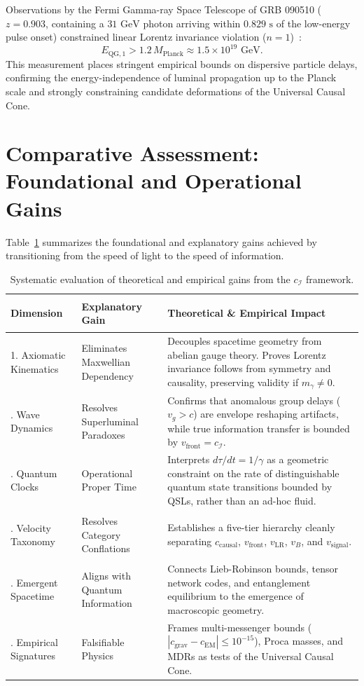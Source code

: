 \documentclass[11pt,a4paper]{article}
\begin{document}
Observations by the Fermi Gamma-ray Space Telescope of GRB 090510 ($z = 0.903$, containing a $31\text{ GeV}$ photon arriving within $0.829\text{ s}$ of the low-energy pulse onset) constrained linear Lorentz invariance violation ($n = 1$)~\cite{fermi2009}:
\begin{equation}
E_{\text{QG}, 1} > 1.2\, M_{\text{Planck}} \approx 1.5 \times 10^{19}\text{ GeV}.
\end{equation}
This measurement places stringent empirical bounds on dispersive particle delays, confirming the energy-independence of luminal propagation up to the Planck scale and strongly constraining candidate deformations of the Universal Causal Cone.

\section{Comparative Assessment: Foundational and Operational Gains}

Table~\ref{tab:evaluation} summarizes the foundational and explanatory gains achieved by transitioning from the speed of light to the speed of information.

\begin{table}[htbp]
\centering
\small
\begin{tabularx}{\linewidth}{>{\bfseries\raggedright}p{3.5cm} >{\raggedright}p{3.0cm} X}
\toprule
Dimension & Explanatory Gain & Theoretical \& Empirical Impact \\
\midrule
1. Axiomatic Kinematics & Eliminates Maxwellian Dependency & Decouples spacetime geometry from abelian gauge theory. Proves Lorentz invariance follows from symmetry and causality, preserving validity if $m_\gamma \neq 0$. \\
\addlinespace
2. Wave Dynamics & Resolves Superluminal Paradoxes & Confirms that anomalous group delays ($v_g > c$) are envelope reshaping artifacts, while true information transfer is bounded by $v_{\text{front}} = c_{\mathcal{I}}$. \\
\addlinespace
3. Quantum Clocks & Operational Proper Time & Interprets $d\tau/dt = 1/\gamma$ as a geometric constraint on the rate of distinguishable quantum state transitions bounded by QSLs, rather than an ad-hoc fluid. \\
\addlinespace
4. Velocity Taxonomy & Resolves Category Conflations & Establishes a five-tier hierarchy cleanly separating $c_{\text{causal}}$, $v_{\text{front}}$, $v_{\text{LR}}$, $v_B$, and $v_{\text{signal}}$. \\
\addlinespace
5. Emergent Spacetime & Aligns with Quantum Information & Connects Lieb-Robinson bounds, tensor network codes, and entanglement equilibrium to the emergence of macroscopic geometry. \\
\addlinespace
6. Empirical Signatures & Falsifiable Physics & Frames multi-messenger bounds ($|c_{\text{grav}} - c_{\text{EM}}| \le 10^{-15}$), Proca masses, and MDRs as tests of the Universal Causal Cone. \\
\bottomrule
\end{tabularx}
\caption{Systematic evaluation of theoretical and empirical gains from the $c_{\mathcal{I}}$ framework.}
\label{tab:evaluation}
\end{table}
\end{document}
